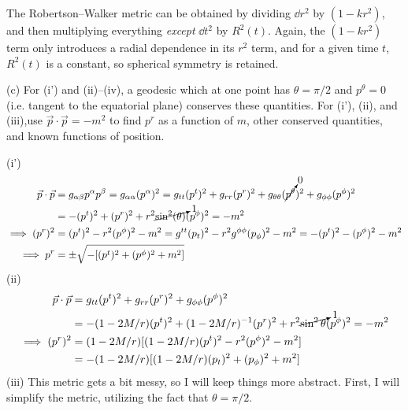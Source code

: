 \documentclass[gr-notes.tex]{subfiles}
\begin{document}
The Robertson--Walker metric can be obtained by dividing $\dd{r}^2$ by $(1 - kr^2)$, and then multiplying everything \emph{except} $\dd{t}^2$ by $R^2(t)$. Again, the $(1 - kr^2)$ term only introduces a radial dependence in its $r^2$ term, and for a given time $t$, $R^2(t)$ is a constant, so spherical symmetry is retained.


(c) For (i') and (ii)--(iv), a geodesic which at one point has $\theta = \pi/2$ and $p^\theta = 0$ (i.e. tangent to the equatorial plane) conserves these quantities. For (i'), (ii), and (iii),use $\vec{p} \cdot \vec{p} = -m^2$ to find $p^r$ as a function of $m$, other conserved quantities, and known functions of position.

(i')
%
\begin{align*}
  \vec{p} \cdot \vec{p} &=
  g_{\alpha\beta} p^\alpha p^\beta =
  g_{\alpha\alpha} (p^\alpha)^2 =
  g_{tt} (p^t)^2 +
  g_{rr} (p^r)^2 +
  g_{\theta\theta} (\cancelto{0}{p^\theta})^2 +
  g_{\phi\phi} (p^\phi)^2
  \\ &=
  -(p^t)^2 + (p^r)^2 + r^2 \cancelto{1}{\sin^2(\theta)} (p^\phi)^2 =
  -m^2
  \\ \implies
  (p^r)^2 &=
  (p^t)^2 - r^2 (p^\phi)^2 - m^2 =
  g^{tt} (p_t)^2 - r^2 g^{\phi\phi} (p_\phi)^2 - m^2 =
  -(p^t)^2 - (p^\phi)^2 - m^2
  \\ \implies
  p^r &=
  \pm\sqrt{-[(p^t)^2 + (p^\phi)^2 + m^2]}
\end{align*}
%
(ii)
%
\begin{align*}
  \vec{p} \cdot \vec{p} &=
  g_{tt} (p^t)^2 +
  g_{rr} (p^r)^2 +
  g_{\phi\phi} (p^\phi)^2
  \\ &=
 -(1 - 2M/r) (p^t)^2 +
  (1 - 2M/r)^{-1} (p^r)^2 +
  r^2 \cancelto{1}{\sin^2\theta} (p^\phi)^2 = -m^2
  \\ \implies
  (p^r)^2 &=
  (1 - 2M/r) [ (1 - 2M/r) (p^t)^2 - r^2 (p^\phi)^2 - m^2 ]
  \\ &=
 -(1 - 2M/r) [ (1 - 2M/r) (p_t)^2 + (p_\phi)^2 + m^2 ]
\end{align*}
%
(iii)
%
This metric gets a bit messy, so I will keep things more abstract. First, I will simplify the metric, utilizing the fact that $\theta = \pi/2$.
%
\end{document}
